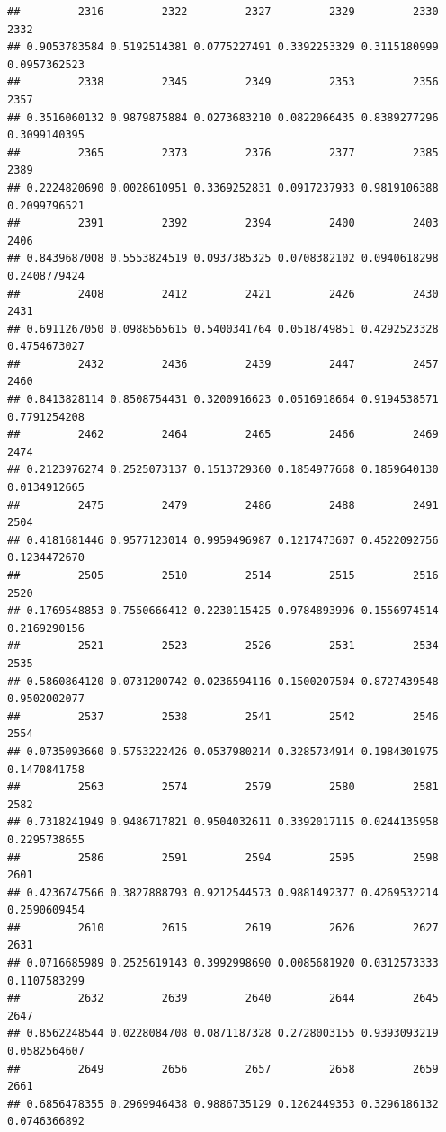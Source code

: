 \documentclass[
]{article}
\begin{document}
\begin{verbatim}
##         2316         2322         2327         2329         2330         2332 
## 0.9053783584 0.5192514381 0.0775227491 0.3392253329 0.3115180999 0.0957362523 
##         2338         2345         2349         2353         2356         2357 
## 0.3516060132 0.9879875884 0.0273683210 0.0822066435 0.8389277296 0.3099140395 
##         2365         2373         2376         2377         2385         2389 
## 0.2224820690 0.0028610951 0.3369252831 0.0917237933 0.9819106388 0.2099796521 
##         2391         2392         2394         2400         2403         2406 
## 0.8439687008 0.5553824519 0.0937385325 0.0708382102 0.0940618298 0.2408779424 
##         2408         2412         2421         2426         2430         2431 
## 0.6911267050 0.0988565615 0.5400341764 0.0518749851 0.4292523328 0.4754673027 
##         2432         2436         2439         2447         2457         2460 
## 0.8413828114 0.8508754431 0.3200916623 0.0516918664 0.9194538571 0.7791254208 
##         2462         2464         2465         2466         2469         2474 
## 0.2123976274 0.2525073137 0.1513729360 0.1854977668 0.1859640130 0.0134912665 
##         2475         2479         2486         2488         2491         2504 
## 0.4181681446 0.9577123014 0.9959496987 0.1217473607 0.4522092756 0.1234472670 
##         2505         2510         2514         2515         2516         2520 
## 0.1769548853 0.7550666412 0.2230115425 0.9784893996 0.1556974514 0.2169290156 
##         2521         2523         2526         2531         2534         2535 
## 0.5860864120 0.0731200742 0.0236594116 0.1500207504 0.8727439548 0.9502002077 
##         2537         2538         2541         2542         2546         2554 
## 0.0735093660 0.5753222426 0.0537980214 0.3285734914 0.1984301975 0.1470841758 
##         2563         2574         2579         2580         2581         2582 
## 0.7318241949 0.9486717821 0.9504032611 0.3392017115 0.0244135958 0.2295738655 
##         2586         2591         2594         2595         2598         2601 
## 0.4236747566 0.3827888793 0.9212544573 0.9881492377 0.4269532214 0.2590609454 
##         2610         2615         2619         2626         2627         2631 
## 0.0716685989 0.2525619143 0.3992998690 0.0085681920 0.0312573333 0.1107583299 
##         2632         2639         2640         2644         2645         2647 
## 0.8562248544 0.0228084708 0.0871187328 0.2728003155 0.9393093219 0.0582564607 
##         2649         2656         2657         2658         2659         2661 
## 0.6856478355 0.2969946438 0.9886735129 0.1262449353 0.3296186132 0.0746366892 

\end{verbatim}
\end{document}
